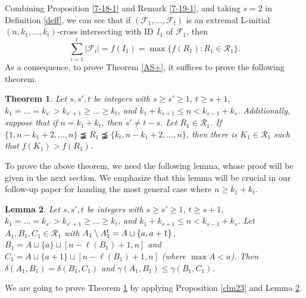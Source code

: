 \documentclass[a4paper,11pt]{article}
\newtheorem{theorem}{Theorem}[section]
\newtheorem{lemma}[theorem]{Lemma}
\begin{document}
Combining  Proposition \ref{7-18-1} and Remark \ref{7-19-1}, and taking $s=2$ in Definition \ref{deff},  we can see that if
$(\mathcal{F}_1, \dots, \mathcal{F}_t)$ is an extremal L-initial $(n, k_1, \dots, k_t)$-cross intersecting with ID $I_1$ of $\mathcal{F}_1$,  then
$$\sum_{i=1}^t|\mathcal{F}_i|=f(I_1)=\max \{f(R_1): R_1\in \mathcal{R}_1\}.$$
As a consequence, to prove Theorem \ref{AS+}, it suffices to prove the following theorem.

\begin{theorem}\label{7-19-2}
Let $s, s', t$ be integers with $s\geq s'\geq 1$, $t\geq s+1$, $k_1=\dots=k_{s'}> k_{s'+1}\geq\dots\geq k_t$, and $k_1+k_{s+1}\leq n <k_{s-1}+k_s$.  Additionally, suppose that if $n=k_1+k_t$, then $s'\ne t-s$.
Let $R_1\in \mathcal{R}_1$. If $\{1, n-k_1+2, \dots, n\}\precneqq   R_1\precneqq \{k_t, n-k_1+2, \dots, n\}$,  then there is $K_1\in \mathcal{R}_1$ such that $f(K_1)>f(R_1)$.
\end{theorem}

To prove the above theorem, we need  the following lemma, whose proof will be given in the next section.
We emphasize that this lemma will be crucial in our follow-up paper \cite{hpgeneral} for handing the most general case where $n\geq k_1+k_t$.

\begin{lemma}\label{claim4}
Let $s, s', t$ be integers with $s\geq s'\geq 1$, $t\geq s+1$, $k_1=\dots=k_{s'}> k_{s'+1}\geq\dots\geq k_t$, and $k_1+k_{s+1}\leq n <k_{s-1}+k_s$.
Let $A_1, B_1, C_1\in \mathcal{R}_1$ with  $A_1\setminus A_1^{\rm t}=A\sqcup \{a, a+1\}$, $B_1=A\sqcup \{a\}\sqcup [n-\ell(B_1)+1, n]$ and $C_1=A\sqcup \{a+1\}\sqcup [n-\ell(B_1)+1, n]$ (where $\max A<a$).
Then $\delta(A_1, B_1)=\delta(B_1, C_1)$ and $\gamma(A_1, B_1)\leq \gamma(B_1, C_1)$.
\end{lemma}


We are going to prove Theorem \ref{7-19-2} by applying Proposition \ref{clm23} and Lemma \ref{claim4}.
\end{document}
